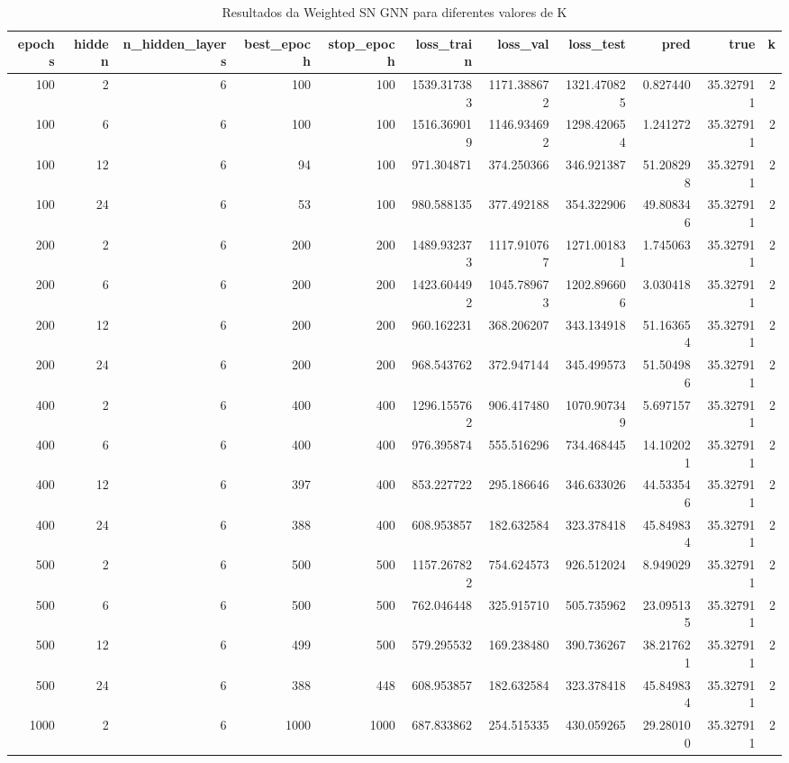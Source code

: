 \begin{table}
\caption{Resultados da Weighted SN GNN para diferentes valores de K}
\label{tab:weighted_gnn_results_all_k}
\begin{tabular}{rrrrrrrrrrr}
\toprule
epochs & hidden & n\_hidden\_layers & best\_epoch & stop\_epoch & loss\_train & loss\_val & loss\_test & pred & true & k \\
\midrule
100 & 2 & 6 & 100 & 100 & 1539.317383 & 1171.388672 & 1321.470825 & 0.827440 & 35.327911 & 2 \\
100 & 6 & 6 & 100 & 100 & 1516.369019 & 1146.934692 & 1298.420654 & 1.241272 & 35.327911 & 2 \\
100 & 12 & 6 & 94 & 100 & 971.304871 & 374.250366 & 346.921387 & 51.208298 & 35.327911 & 2 \\
100 & 24 & 6 & 53 & 100 & 980.588135 & 377.492188 & 354.322906 & 49.808346 & 35.327911 & 2 \\
200 & 2 & 6 & 200 & 200 & 1489.932373 & 1117.910767 & 1271.001831 & 1.745063 & 35.327911 & 2 \\
200 & 6 & 6 & 200 & 200 & 1423.604492 & 1045.789673 & 1202.896606 & 3.030418 & 35.327911 & 2 \\
200 & 12 & 6 & 200 & 200 & 960.162231 & 368.206207 & 343.134918 & 51.163654 & 35.327911 & 2 \\
200 & 24 & 6 & 200 & 200 & 968.543762 & 372.947144 & 345.499573 & 51.504986 & 35.327911 & 2 \\
400 & 2 & 6 & 400 & 400 & 1296.155762 & 906.417480 & 1070.907349 & 5.697157 & 35.327911 & 2 \\
400 & 6 & 6 & 400 & 400 & 976.395874 & 555.516296 & 734.468445 & 14.102021 & 35.327911 & 2 \\
400 & 12 & 6 & 397 & 400 & 853.227722 & 295.186646 & 346.633026 & 44.533546 & 35.327911 & 2 \\
400 & 24 & 6 & 388 & 400 & 608.953857 & 182.632584 & 323.378418 & 45.849834 & 35.327911 & 2 \\
500 & 2 & 6 & 500 & 500 & 1157.267822 & 754.624573 & 926.512024 & 8.949029 & 35.327911 & 2 \\
500 & 6 & 6 & 500 & 500 & 762.046448 & 325.915710 & 505.735962 & 23.095135 & 35.327911 & 2 \\
500 & 12 & 6 & 499 & 500 & 579.295532 & 169.238480 & 390.736267 & 38.217621 & 35.327911 & 2 \\
500 & 24 & 6 & 388 & 448 & 608.953857 & 182.632584 & 323.378418 & 45.849834 & 35.327911 & 2 \\
1000 & 2 & 6 & 1000 & 1000 & 687.833862 & 254.515335 & 430.059265 & 29.280100 & 35.327911 & 2 \\

\end{tabular}
\end{table}
